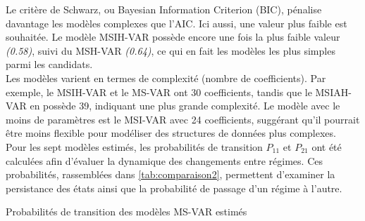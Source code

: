 Le critère de Schwarz, ou Bayesian Information Criterion (BIC), pénalise davantage les modèles complexes que l'AIC. Ici aussi, une valeur plus faible est souhaitée.
Le modèle MSIH-VAR possède encore une fois la plus faible valeur \textit{(0.58)}, suivi du MSH-VAR \textit{(0.64)}, ce qui en fait les modèles les plus simples parmi les candidats.\\

Les modèles varient en termes de complexité (nombre de coefficients). Par exemple, le MSIH-VAR et le MS-VAR ont 30 coefficients, tandis que le MSIAH-VAR en possède 39, indiquant une plus grande complexité. Le modèle avec le moins de paramètres est le MSI-VAR avec 24 coefficients, suggérant qu'il pourrait être moins flexible pour modéliser des structures de données plus complexes.\\

Pour les sept modèles estimés, les probabilités de transition \( P_{11} \) et \( P_{21} \) ont été calculées afin d'évaluer la dynamique des changements entre régimes. Ces probabilités, rassemblées dans \autoref{tab:comparaison2}, permettent d'examiner la persistance des états ainsi que la probabilité de passage d'un régime à l'autre.

\begin{table}[H]
    \centering
    \caption{Probabilités de transition des modèles MS-VAR estimés}
    \sffamily
    
    \label{tab:comparaison2}
\end{table}

